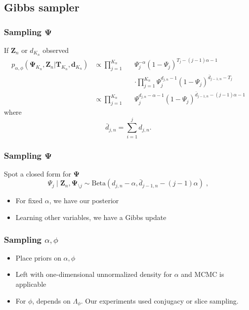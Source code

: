 \documentclass[final,hyperref={pdfpagelabels=false},noamsthm]{beamer}
\newcommand{\ee}{Z} %
\newcommand{\bfee}{\mathbf{\ee}}
\newcommand{\bfT}{\mathbf{T}}
\newcommand{\bfPsi}{\boldsymbol{\Psi}}
\newcommand{\bfd}{\mathbf{d}}
\begin{document}
\subsection{Gibbs sampler}
\begin{frame}
\frametitle{Sampling $\bfPsi$}

If $\bfee_n$ or $d_{K_n}$ observed
\begin{align*}
	p_{\alpha, \phi}(\bfPsi_{K_n}, \bfee_n | \bfT_{K_n}, \bfd_{K_n}) &\propto \prod_{j=1}^{K_n} &&\Psi_j ^{ - \alpha} (1-\Psi_j)^{T_j - (j-1)\alpha - 1} \\
	&&&\cdot \prod_{j=1}^{K_n} \Psi_j^{d_{j,n}-1}(1-\Psi_j)^{\bar{d}_{j-1,n} - T_j}\\
	&\propto \prod_{j=1}^{K_n} &&\Psi_j ^{d_{j,n} - \alpha -1} (1-\Psi_j)^{\bar{d}_{j-1,n} - (j-1)\alpha - 1}
\end{align*}
where
\begin{equation*}
\bar{d}_{j,n} = \sum_{i=1}^j d_{j,n}.
\end{equation*}

\end{frame}

\begin{frame}
	\frametitle{Sampling $\bfPsi$}
	Spot a closed form for $\bfPsi$
	\begin{equation*}
	\Psi_j \mid \bfee_n, \bfPsi_{\setminus j} \sim \text{Beta}(d_{j,n} - \alpha, \bar{d}_{j-1,n} - (j-1)\alpha) \;,
	\end{equation*}
	
	\begin{itemize}
		\item For fixed $\alpha$, we have our posterior
		\item Learning other variables, we have a Gibbs update
	\end{itemize}
\end{frame}

\begin{frame}
	\frametitle{Sampling $\alpha, \phi$}
	\begin{itemize}
		\item Place priors on $\alpha, \phi$
		\item Left with one-dimensional unnormalized density for $\alpha$ and MCMC is applicable
		\item For $\phi$, depends on $\Lambda_\phi$. Our experiments used conjugacy or slice sampling.
	\end{itemize}

\end{frame}
\end{document}
